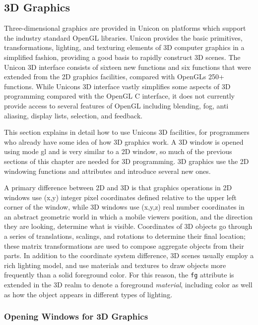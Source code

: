 \subsection{3D Graphics}

Three-dimensional graphics are provided in Unicon on platforms which
support the industry standard OpenGL libraries. Unicon provides the
basic primitives, transformations, lighting, and texturing elements
of 3D computer graphics in a simplified fashion, providing a good basis
to rapidly construct 3D scenes. The Unicon 3D interface consists of
sixteen new functions and six functions that were extended from the 2D
graphics facilities, compared with OpenGL{\textquotesingle}s 250+
functions. While Unicon{\textquotesingle}s 3D interface vastly
simplifies some aspects of 3D programming compared with the OpenGL C
interface, it does not currently provide access to several features of
OpenGL including blending, fog, anti aliasing, display lists,
selection, and feedback.

This section explains in detail how to use Unicon{\textquotesingle}s 3D
facilities, for programmers who already have some idea of how 3D
graphics work. A 3D window is opened using mode
{\textquotedbl}gl{\textquotedbl} and is very similar to a 2D window, so
much of the previous sections of this chapter are needed for 3D
programming. 3D graphics use the 2D windowing functions and attributes
and introduce several new ones.

A primary difference between 2D and 3D is that graphics operations in 2D
windows use (x,y) integer pixel coordinates defined relative to the
upper left corner of the window, while 3D windows use (x,y,z) real
number coordinates in an abstract geometric world in which a mobile
viewer{\textquotesingle}s position, and the direction they are looking,
determine what is visible. Coordinates of 3D objects go through a
series of translations, scalings, and rotations to determine their
final location; these matrix transformations are used to compose
aggregate objects from their parts. In addition to the coordinate
system difference, 3D scenes usually employ a rich lighting model, and
use materials and textures to draw objects more frequently than a solid
foreground color. For this reason, the \texttt{fg} attribute is extended in the
3D realm to denote a foreground \textit{material}, including color as
well as how the object appears in different types of lighting.

\subsubsection{Opening Windows for 3D Graphics}

